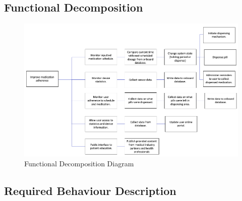 \documentclass[12pt,titlepage]{article}
\begin{document}
\pagebreak
\subsection{Functional Decomposition}
\begin{figure}[!htbp]
    \centering
    \includegraphics[width=\textwidth,height=\textheight,keepaspectratio]{FuncDecomp.png}
    \caption{Functional Decomposition Diagram}
    \label{fig:my_label}
\end{figure}


\pagebreak
\subsection{Required Behaviour Description}
\end{document}
